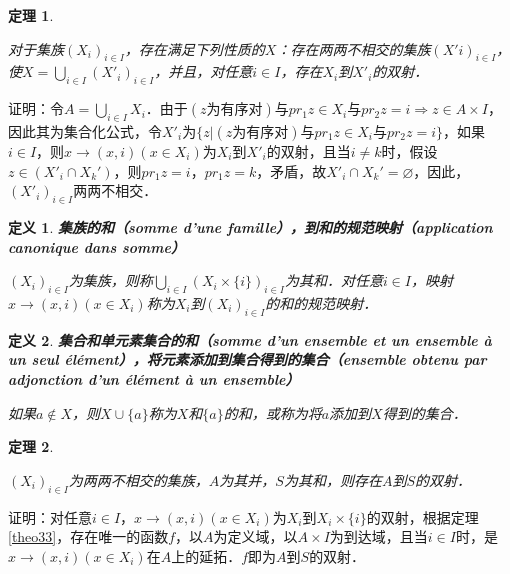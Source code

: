 \documentclass[12pt, a4paper, oneside]{book}
\newtheorem{theo}{定理}
\newtheorem{de}{定义}
\begin{document}
			\begin{theo}\label{theo34}
				\hfill\par
				对于集族$(X_i)_{i\in I}$，存在满足下列性质的$X$：存在两两不相交的集族$(X'i)_{i\in I}$，使$X=\bigcup\limits_{i\in I}({X'}_i)_{i\in I}$，并且，对任意$i\in I$，存在$X_i$到${X'}_i$的双射．
			\end{theo}
			证明：令$A=\bigcup\limits_{i\in I}X_i$．由于$(z\text{为有序对})\text{与}pr_1z\in X_i\text{与}pr_2z=i \Rightarrow z\in A\times I$，因此其为集合化公式，令${X'}_i$为$\{z|(z\text{为有序对})\text{与}pr_1z\in X_i\text{与}pr_2z=i\}$，如果$i\in I$，则$x\to (x, i)(x\in X_i)$为$X_i$到${X'}_i$的双射，且当$i\neq k$时，假设$z\in ({X'}_i\cap X_k')$，则$pr_1z=i$，$pr_1z=k$，矛盾，故${X'}_i\cap X_k'=\varnothing$，因此，$({X'}_i)_{i\in I}$两两不相交．

			\begin{de}
				\textbf{集族的和（somme d'une famille），到和的规范映射（application canonique dans somme）}
				\par
				$(X_i)_{i\in I}$为集族，则称$\bigcup\limits_{i\in I}(X_i\times \{i\})_{i\in I}$为其和．对任意$i\in I$，映射$x\to (x, i)(x\in X_i)$称为$X_i$到$(X_i)_{i\in I}$的和的规范映射．
			\end{de}

			\begin{de}
				\textbf{集合和单元素集合的和（somme d'un ensemble et un ensemble à un seul élément），将元素添加到集合得到的集合（ensemble obtenu par adjonction d'un élément à un ensemble）}
				\par
				如果$a\notin X$，则$X\cup\{a\}$称为$X$和$\{a\}$的和，或称为将$a$添加到$X$得到的集合．
			\end{de}
						
			\begin{theo}\label{theo35}
				\hfill\par
				$(X_i)_{i\in I}$为两两不相交的集族，$A$为其并，$S$为其和，则存在$A$到$S$的双射．
			\end{theo}
			证明：对任意$i\in I$，$x\to (x, i)(x\in X_i)$为$X_i$到$X_i\times \{i\}$的双射，根据定理\ref{theo33}，存在唯一的函数$f$，以$A$为定义域，以$A\times I$为到达域，且当$i\in I$时，是$x\to (x, i)(x\in X_i)$在$A$上的延拓．$f$即为$A$到$S$的双射．
			
\end{document}
